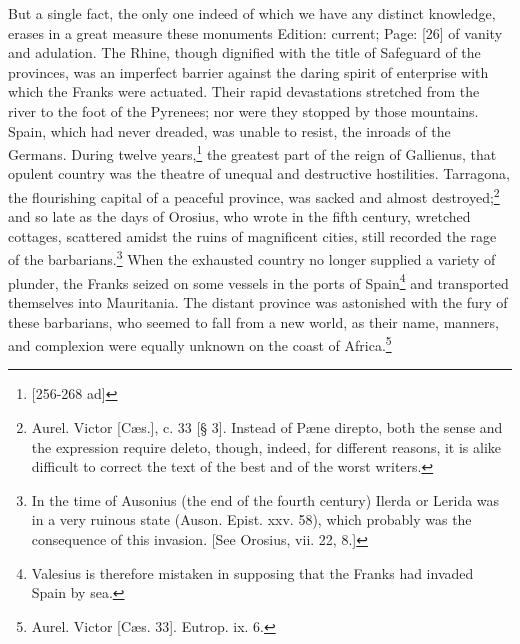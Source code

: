 But a single fact, the only one indeed of which we have any distinct knowledge, erases in a great measure these monuments Edition: current; Page: [26] of vanity and adulation. The Rhine, though dignified with the title of Safeguard of the provinces, was an imperfect barrier against the daring spirit of enterprise with which the Franks were actuated. Their rapid devastations stretched from the river to the foot of the Pyrenees; nor were they stopped by those mountains. Spain, which had never dreaded, was unable to resist, the inroads of the Germans. During twelve years,\footnote{[256-268 ad]} the greatest part of the reign of Gallienus, that opulent country was the theatre of unequal and destructive hostilities. Tarragona, the flourishing capital of a peaceful province, was sacked and almost destroyed;\footnote{Aurel. Victor [Cæs.], c. 33 [§ 3]. Instead of Pæne direpto, both the sense and the expression require deleto, though, indeed, for different reasons, it is alike difficult to correct the text of the best and of the worst writers.} and so late as the days of Orosius, who wrote in the fifth century, wretched cottages, scattered amidst the ruins of magnificent cities, still recorded the rage of the barbarians.\footnote{In the time of Ausonius (the end of the fourth century) Ilerda or Lerida was in a very ruinous state (Auson. Epist. xxv. 58), which probably was the consequence of this invasion. [See Orosius, vii. 22, 8.]} When the exhausted country no longer supplied a variety of plunder, the Franks seized on some vessels in the ports of Spain\footnote{Valesius is therefore mistaken in supposing that the Franks had invaded Spain by sea.} and transported themselves into Mauritania. The distant province was astonished with the fury of these barbarians, who seemed to fall from a new world, as their name, manners, and complexion were equally unknown on the coast of Africa.\footnote{Aurel. Victor [Cæs. 33]. Eutrop. ix. 6.}


